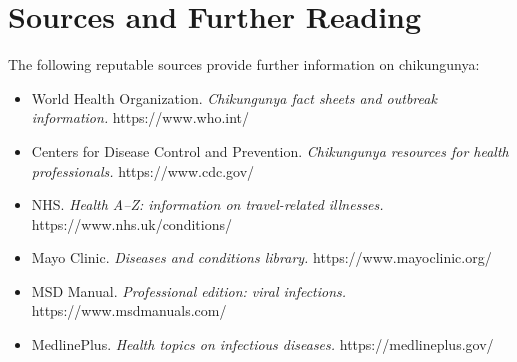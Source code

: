 \section*{Sources and Further Reading}
The following reputable sources provide further information on chikungunya:
\begin{itemize}
    \item World Health Organization. \textit{Chikungunya fact sheets and outbreak information.} https://www.who.int/
    \item Centers for Disease Control and Prevention. \textit{Chikungunya resources for health professionals.} https://www.cdc.gov/
    \item NHS. \textit{Health A--Z: information on travel-related illnesses.} https://www.nhs.uk/conditions/
    \item Mayo Clinic. \textit{Diseases and conditions library.} https://www.mayoclinic.org/
    \item MSD Manual. \textit{Professional edition: viral infections.} https://www.msdmanuals.com/
    \item MedlinePlus. \textit{Health topics on infectious diseases.} https://medlineplus.gov/
\end{itemize}
